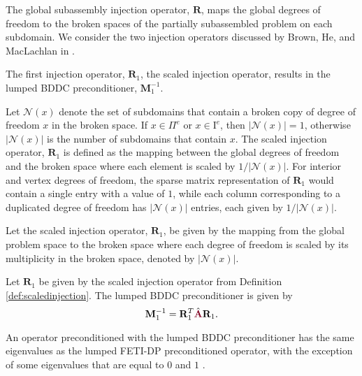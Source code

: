 The global subassembly injection operator, $\mathbf{R}$, maps the global degrees of freedom to the broken spaces of the partially subassembled problem on each subdomain.
We consider the two injection operators discussed by Brown, He, and MacLachlan in \cite{brown2019local}.

The first injection operator, $\mathbf{R}_1$, the scaled injection operator, results in the lumped BDDC preconditioner, $\mathbf{M}^{-1}_1$.

Let $\mathcal{N} \left( x \right)$ denote the set of subdomains that contain a broken copy of degree of freedom $x$ in the broken space.
If $x \in \Pi^e$ or $x \in \text{I}^e$, then $\lvert \mathcal{N} \left( x \right) \rvert = 1$, otherwise $\lvert \mathcal{N} \left( x \right) \rvert$ is the number of subdomains that contain $x$.
The scaled injection operator, $\mathbf{R}_1$ is defined as the mapping between the global degrees of freedom and the broken space where each element is scaled by $1 / \lvert \mathcal{N} \left( x \right) \rvert$.
For interior and vertex degrees of freedom, the sparse matrix representation of $\mathbf{R}_1$ would contain a single entry with a value of $1$, while each column corresponding to a duplicated degree of freedom has $\lvert \mathcal{N} \left( x \right) \rvert$ entries, each given by $1 / \lvert \mathcal{N} \left( x \right) \rvert$.

\begin{definition}
Let the scaled injection operator, $\mathbf{R}_1$, be given by the mapping from the global problem space to the broken space where each degree of freedom is scaled by its multiplicity in the broken space, denoted by $\lvert \mathcal{N} \left( x \right) \rvert$.
\label{def:scaledinjection}
\end{definition}

\begin{definition}
Let $\mathbf{R}_1$ be given by the scaled injection operator from Definition \ref{def:scaledinjection}.
The lumped BDDC preconditioner is given by
\begin{equation}
\mathbf{M}^{-1}_1 = \mathbf{R}_1^T \hat{\color{burgundy}\mathbf{A}} \mathbf{R}_1.
\end{equation}
\label{def:lumpedbddc}
\end{definition}

An operator preconditioned with the lumped BDDC preconditioner has the same eigenvalues as the lumped FETI-DP preconditioned operator, with the exception of some eigenvalues that are equal to $0$ and $1$ \cite{li2007use}.

